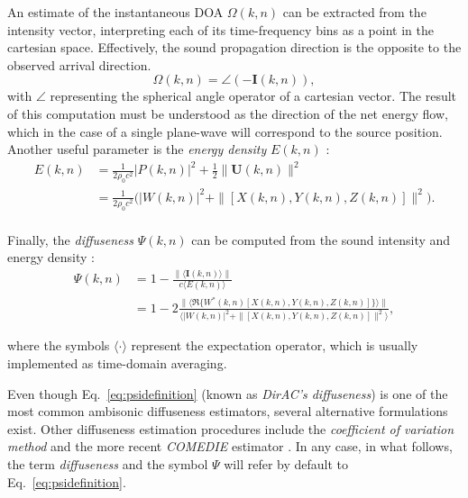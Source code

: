 An estimate of the instantaneous DOA $\Omega(k,n)$ can be extracted from the intensity vector, interpreting each of its time-frequency bins as a point in the cartesian space. Effectively, the sound propagation direction is the opposite to the observed arrival direction. 
\begin{equation}
	\Omega(k,n) = \angle(-\pmb{I}(k,n)),
\label{eq:doa}
\end{equation}
with $\angle$ representing the spherical angle operator of a cartesian vector. The result of this computation must be understood as the direction of the net energy flow, which in the case of a single plane-wave will correspond to the source position. \\

Another useful parameter is the \textit{energy density} $E(k,n)$ \cite{stanzial1996reactive}:
\begin{equation}
	\begin{aligned}
		E(k,n) &= \frac{1}{2\rho_0 c^2} |P(k,n)|^2 + \frac{1}{2} {\|\pmb{U}(k,n)\|^2} \\
		&=  \frac{1}{2\rho_0 c^2} \Big(|W(k,n)|^2 + \| [X(k,n), Y(k,n), Z(k,n)] \|^2\Big).
	\end{aligned}
	\label{eq:energydensity}
\end{equation}\\

Finally, the \textit{diffuseness} $\Psi(k,n)$ can be computed from the sound intensity and  energy density \cite{merimaa2005spatial}:
\begin{equation}
	\begin{aligned}
		\Psi(k,n) &= 1 - \frac{ \| \langle \pmb{I}(k,n) \rangle \| }{ c \langle E(k,n) \rangle } \\
		&= 1 - 2\frac{ \| \langle \Re\{W^*(k,n)[X(k,n),Y(k,n),Z(k,n)]\} \rangle \| }{ \langle |W(k,n)|^2 + \| [X(k,n), Y(k,n), Z(k,n)] \|^2 \rangle },
	\end{aligned}
\label{eq:psidefinition}
\end{equation}
 
 where the symbols $\langle \cdot \rangle$ represent the expectation operator, which is usually implemented as time-domain averaging. 

Even though Eq.~\ref{eq:psidefinition} (known as \textit{DirAC's diffuseness}) is one of the most common ambisonic diffuseness estimators, several alternative formulations exist. 
Other diffuseness estimation procedures include the \textit{coefficient of variation method} \cite{ahonen2009diffuseness} and the more recent \textit{COMEDIE} estimator \cite{epain2016spherical}. 
In any case, in what follows, the term \textit{diffuseness} and the symbol $\Psi$ will refer by default to Eq.~\ref{eq:psidefinition}. 


